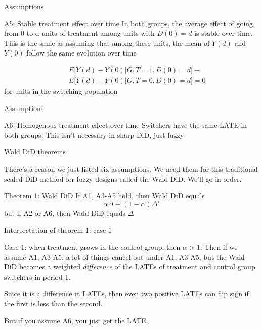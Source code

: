 \documentclass{beamer}
\begin{document}
\begin{frame}{Assumptions}

\begin{block}{A5: Stable treatment effect over time}
In both groups, the average effect of going from 0 to d units of treatment among units with $D(0)=d$  is stable over time.  This is the same as assuming that among these units, the mean of $Y(d)$ and $Y(0)$ follow the same evolution over time
\end{block}

\begin{eqnarray*}
&&E \bigg [ Y(d) - Y(0) | G, T=1, D(0) = d \bigg ] -\\
&& E \bigg [Y(d) - Y(0) | G, T=0, D(0)=d \bigg ] =0
\end{eqnarray*}for units in the switching population

\end{frame}

\begin{frame}{Assumptions}

\begin{block}{A6: Homogenous treatment effect over time}
Switchers have the same LATE in both groups.  This isn't necessary in sharp DiD, just fuzzy
\end{block}

\end{frame}


\begin{frame}{Wald DiD theorems}

There's a reason we just listed six assumptions.  We need them for this traditional scaled DiD method for fuzzy designs called the Wald DiD.  We'll go in order. 

\begin{block}{Theorem 1: Wald DiD}
If A1, A3-A5 hold, then Wald DiD equals $$\alpha \Delta + (1-\alpha) \Delta '$$but if A2 or A6, then Wald DiD equals $\Delta$
\end{block}


\end{frame}


\begin{frame}{Interpretation of theorem 1: case 1}

Case 1: when treatment grows in the control group, then $\alpha>1$.  Then if we assume A1, A3-A5, a lot of things cancel out under A1, A3-A5, but the Wald DiD becomes a weighted \emph{difference} of the LATEs of treatment and control group switchers in period 1. \\

\bigskip

Since it is a difference in LATEs, then even two positive LATEs can flip sign if the first is less than the second. \\

\bigskip 

But if you assume A6, you just get the LATE.  

\end{frame}
\end{document}
